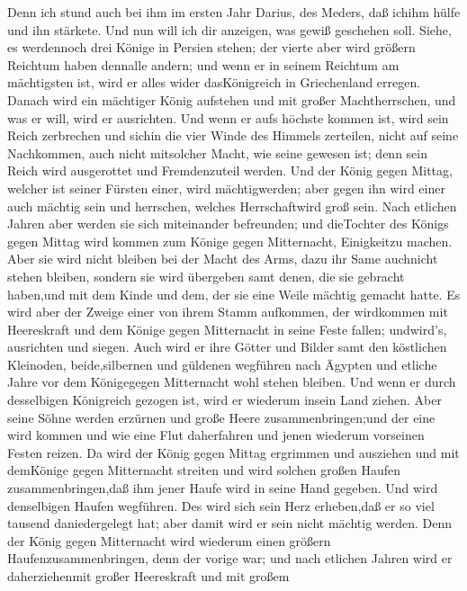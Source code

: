  Denn ich stund auch bei ihm im ersten Jahr Darius, des
Meders, daß ichihm hülfe und ihn stärkete.  Und nun will ich
dir anzeigen, was gewiß geschehen soll. Siehe, es werdennoch drei Könige
in Persien stehen; der vierte aber wird größern Reichtum haben dennalle
andern; und wenn er in seinem Reichtum am mächtigsten ist, wird er alles
wider dasKönigreich in Griechenland erregen.  Danach wird
ein mächtiger König aufstehen und mit großer Machtherrschen, und was er
will, wird er ausrichten.  Und wenn er aufs höchste kommen
ist, wird sein Reich zerbrechen und sichin die vier Winde des Himmels
zerteilen, nicht auf seine Nachkommen, auch nicht mitsolcher Macht, wie
seine gewesen ist; denn sein Reich wird ausgerottet und Fremdenzuteil
werden.  Und der König gegen Mittag, welcher ist seiner
Fürsten einer, wird mächtigwerden; aber gegen ihn wird einer auch
mächtig sein und herrschen, welches Herrschaftwird groß sein.
 Nach etlichen Jahren aber werden sie sich miteinander
befreunden; und dieTochter des Königs gegen Mittag wird kommen zum
Könige gegen Mitternacht, Einigkeitzu machen. Aber sie wird nicht
bleiben bei der Macht des Arms, dazu ihr Same auchnicht stehen bleiben,
sondern sie wird übergeben samt denen, die sie gebracht haben,und mit
dem Kinde und dem, der sie eine Weile mächtig gemacht hatte.
 Es wird aber der Zweige einer von ihrem Stamm aufkommen,
der wirdkommen mit Heereskraft und dem Könige gegen Mitternacht in seine
Feste fallen; undwird's, ausrichten und siegen.  Auch wird
er ihre Götter und Bilder samt den köstlichen Kleinoden, beide,silbernen
und güldenen wegführen nach Ägypten und etliche Jahre vor dem
Königegegen Mitternacht wohl stehen bleiben.  Und wenn er
durch desselbigen Königreich gezogen ist, wird er wiederum insein Land
ziehen.  Aber seine Söhne werden erzürnen und große Heere
zusammenbringen;und der eine wird kommen und wie eine Flut daherfahren
und jenen wiederum vorseinen Festen reizen.  Da wird der
König gegen Mittag ergrimmen und ausziehen und mit demKönige gegen
Mitternacht streiten und wird solchen großen Haufen zusammenbringen,daß
ihm jener Haufe wird in seine Hand gegeben.  Und wird
denselbigen Haufen wegführen. Des wird sich sein Herz erheben,daß er so
viel tausend daniedergelegt hat; aber damit wird er sein nicht mächtig
werden.  Denn der König gegen Mitternacht wird wiederum
einen größern Haufenzusammenbringen, denn der vorige war; und nach
etlichen Jahren wird er daherziehenmit großer Heereskraft und mit großem
